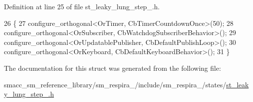 Definition at line 25 of file st\+\_\+leaky\+\_\+lung\+\_\+step\+\_.\+h.


\begin{DoxyCode}
26     \{
27         configure\_orthogonal<OrTimer, CbTimerCountdownOnce>(50);
28         configure\_orthogonal<OrSubscriber, CbWatchdogSubscriberBehavior>();
29         configure\_orthogonal<OrUpdatablePublisher, CbDefaultPublishLoop>();
30         configure\_orthogonal<OrKeyboard, CbDefaultKeyboardBehavior>();
31     \}
\end{DoxyCode}


The documentation for this struct was generated from the following file\+:\begin{DoxyCompactItemize}
\item 
smacc\+\_\+sm\+\_\+reference\+\_\+library/sm\+\_\+respira\+\_/include/sm\+\_\+respira\+\_/states/\hyperlink{st__leaky__lung__step__3_8h}{st\+\_\+leaky\+\_\+lung\+\_\+step\+\_.\+h}\end{DoxyCompactItemize}

